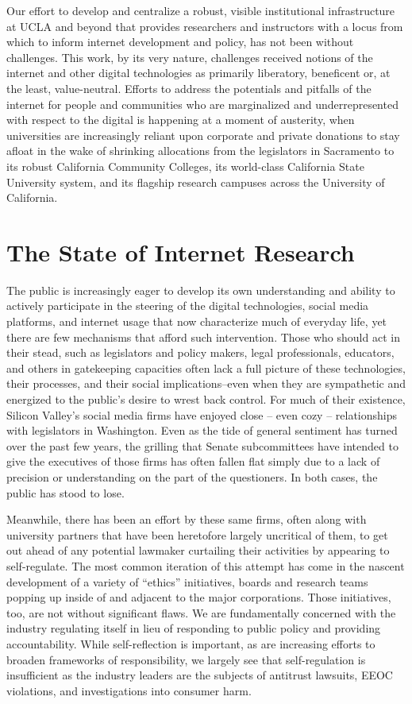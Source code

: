 \documentclass[11pt]{article}
\begin{document}
Our effort to develop and centralize a robust, visible institutional infrastructure at UCLA and beyond that provides researchers and instructors with a locus from which to inform internet development and policy, has not been without challenges. This work, by its very nature, challenges received notions of the internet and other digital technologies as primarily liberatory, beneficent or, at the least, value-neutral. Efforts to address the potentials and pitfalls of the internet for people and communities who are marginalized and underrepresented with respect to the digital is happening at a moment of austerity, when universities are increasingly reliant upon corporate and private donations to stay afloat in the wake of shrinking allocations from the legislators in Sacramento to its robust California Community Colleges, its world-class California State University system, and its flagship research campuses across the University of California.

\section{The State of Internet Research}
The public is increasingly eager to develop its own understanding and ability to actively participate in the steering of the digital technologies, social media platforms, and internet usage that now characterize much of everyday life, yet there are few mechanisms that afford such intervention. Those who should act in their stead, such as legislators and policy makers, legal professionals, educators, and others in gatekeeping capacities often lack a full picture of these technologies, their processes, and their social implications--even when they are sympathetic and energized to the public’s desire to wrest back control. For much of their existence, Silicon Valley’s social media firms have enjoyed close -- even cozy -- relationships with legislators in Washington. Even as the tide of general sentiment has turned over the past few years, the grilling that Senate subcommittees have intended to give the executives of those firms has often fallen flat simply due to a lack of precision or understanding on the part of the questioners. In both cases, the public has stood to lose.

Meanwhile, there has been an effort by these same firms, often along with university partners that have been heretofore largely uncritical of them, to get out ahead of any potential lawmaker curtailing their activities by appearing to self-regulate. The most common iteration of this attempt has come in the nascent development of a variety of “ethics” initiatives, boards and research teams popping up inside of and adjacent to the major corporations. Those initiatives, too, are not without significant flaws.  We are fundamentally concerned with the industry regulating itself in lieu of responding to public policy and providing accountability. While self-reflection is important, as are increasing efforts to broaden frameworks of responsibility, we largely see that self-regulation is insufficient as the industry leaders are the subjects of antitrust lawsuits, EEOC violations, and investigations into consumer harm.
\end{document}
